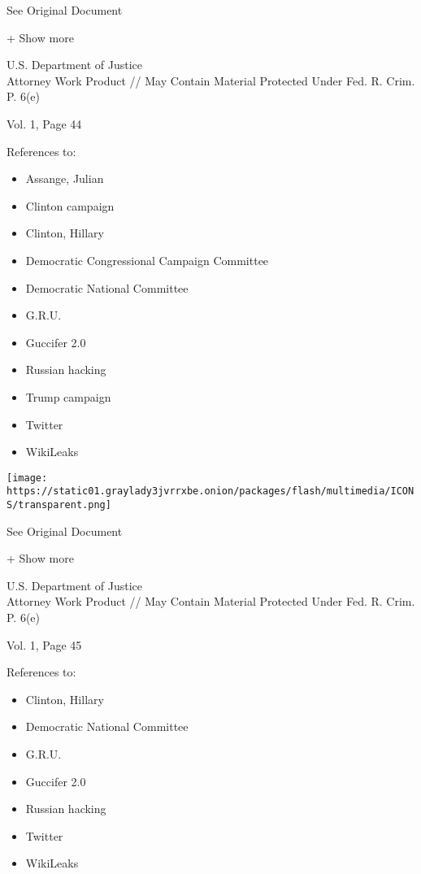 See Original Document

+ Show more

U.S. Department of Justice\\
Attorney Work Product // May Contain Material Protected Under Fed. R.
Crim. P. 6(e)

Vol. 1, Page 44

References to:

\begin{itemize}
\tightlist
\item
  Assange, Julian
\item
  Clinton campaign
\item
  Clinton, Hillary
\item
  Democratic Congressional Campaign Committee
\item
  Democratic National Committee
\item
  G.R.U.
\item
  Guccifer 2.0
\item
  Russian hacking
\item
  Trump campaign
\item
  Twitter
\item
  WikiLeaks
\end{itemize}

\protect\hyperlink{}{}

\texttt{[image: https://static01.graylady3jvrrxbe.onion/packages/flash/multimedia/ICONS/transparent.png]}

See Original Document

+ Show more

U.S. Department of Justice\\
Attorney Work Product // May Contain Material Protected Under Fed. R.
Crim. P. 6(e)

Vol. 1, Page 45

References to:

\begin{itemize}
\tightlist
\item
  Clinton, Hillary
\item
  Democratic National Committee
\item
  G.R.U.
\item
  Guccifer 2.0
\item
  Russian hacking
\item
  Twitter
\item
  WikiLeaks
\end{itemize}

\protect\hyperlink{}{}

